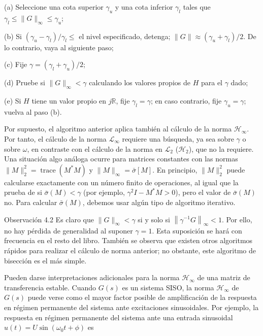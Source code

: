 (a) Seleccione una cota superior $\gamma_{u}$ y una cota inferior $\gamma_{l}$ tales que $\gamma_{l} \leq\|G\|_{\infty} \leq \gamma_{u}$;

(b) Si $\left(\gamma_{u}-\gamma_{l}\right) / \gamma_{l} \leq$ el nivel especificado, detenga; $\|G\| \approx\left(\gamma_{u}+\gamma_{l}\right) / 2$. De lo contrario, vaya al siguiente paso;

(c) Fije $\gamma=\left(\gamma_{l}+\gamma_{u}\right) / 2$;

(d) Pruebe si $\|G\|_{\infty}<\gamma$ calculando los valores propios de $H$ para el $\gamma$ dado;

(e) Si $H$ tiene un valor propio en $j \mathbb{R}$, fije $\gamma_{l}=\gamma$; en caso contrario, fije $\gamma_{u}=\gamma$; vuelva al paso (b).

Por supuesto, el algoritmo anterior aplica también al cálculo de la norma $\mathcal{H}_{\infty}$. Por tanto, el cálculo de la norma $\mathcal{L}_{\infty}$ requiere una búsqueda, ya sea sobre $\gamma$ o sobre $\omega$, en contraste con el cálculo de la norma en $\mathcal{L}_{2}$ ($\mathcal{H}_{2}$), que no la requiere. Una situación algo análoga ocurre para matrices constantes con las normas $\|M\|_{2}^{2}=\operatorname{trace}\left(M^{*} M\right)$ y $\|M\|_{\infty}=\bar{\sigma}[M]$. En principio, $\|M\|_{2}^{2}$ puede calcularse exactamente con un número finito de operaciones, al igual que la prueba de si $\bar{\sigma}(M)<\gamma$ (por ejemplo, $\gamma^{2} I-M^{*} M>0$), pero el valor de $\bar{\sigma}(M)$ no. Para calcular $\bar{\sigma}(M)$, debemos usar algún tipo de algoritmo iterativo.

Observación 4.2 Es claro que $\|G\|_{\infty}<\gamma$ si y solo si $\left\|\gamma^{-1} G\right\|_{\infty}<1$. Por ello, no hay pérdida de generalidad al suponer $\gamma=1$. Esta suposición se hará con frecuencia en el resto del libro. También se observa que existen otros algoritmos rápidos para realizar el cálculo de norma anterior; no obstante, este algoritmo de bisección es el más simple.

Pueden darse interpretaciones adicionales para la norma $\mathcal{H}_{\infty}$ de una matriz de transferencia estable. Cuando $G(s)$ es un sistema SISO, la norma $\mathcal{H}_{\infty}$ de $G(s)$ puede verse como el mayor factor posible de amplificación de la respuesta en régimen permanente del sistema ante excitaciones sinusoidales. Por ejemplo, la respuesta en régimen permanente del sistema ante una entrada sinusoidal $u(t)=U \sin \left(\omega_{0} t+\phi\right)$ es


